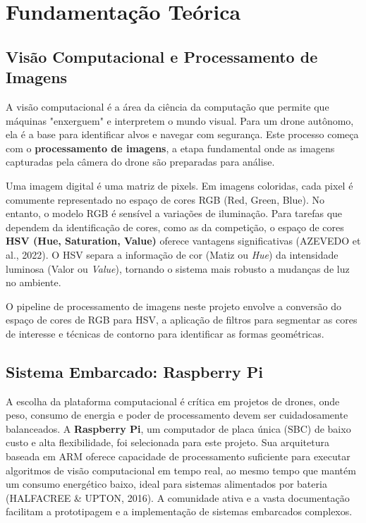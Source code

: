 \documentclass{SBCbookchapter}
\begin{document}
\section{Fundamentação Teórica}

\subsection{Visão Computacional e Processamento de Imagens}
A visão computacional é a área da ciência da computação que permite que máquinas "enxerguem" e interpretem o mundo visual. Para um drone autônomo, ela é a base para identificar alvos e navegar com segurança. Este processo começa com o \textbf{processamento de imagens}, a etapa fundamental onde as imagens capturadas pela câmera do drone são preparadas para análise.

Uma imagem digital é uma matriz de pixels. Em imagens coloridas, cada pixel é comumente representado no espaço de cores RGB (Red, Green, Blue). No entanto, o modelo RGB é sensível a variações de iluminação. Para tarefas que dependem da identificação de cores, como as da competição, o espaço de cores \textbf{HSV (Hue, Saturation, Value)} oferece vantagens significativas (AZEVEDO et al., 2022). O HSV separa a informação de cor (Matiz ou \textit{Hue}) da intensidade luminosa (Valor ou \textit{Value}), tornando o sistema mais robusto a mudanças de luz no ambiente.

O pipeline de processamento de imagens neste projeto envolve a conversão do espaço de cores de RGB para HSV, a aplicação de filtros para segmentar as cores de interesse e técnicas de contorno para identificar as formas geométricas.



\subsection{Sistema Embarcado: Raspberry Pi}
A escolha da plataforma computacional é crítica em projetos de drones, onde peso, consumo de energia e poder de processamento devem ser cuidadosamente balanceados. A \textbf{Raspberry Pi}, um computador de placa única (SBC) de baixo custo e alta flexibilidade, foi selecionada para este projeto. Sua arquitetura baseada em ARM oferece capacidade de processamento suficiente para executar algoritmos de visão computacional em tempo real, ao mesmo tempo que mantém um consumo energético baixo, ideal para sistemas alimentados por bateria (HALFACREE \& UPTON, 2016). A comunidade ativa e a vasta documentação facilitam a prototipagem e a implementação de sistemas embarcados complexos.
\end{document}

